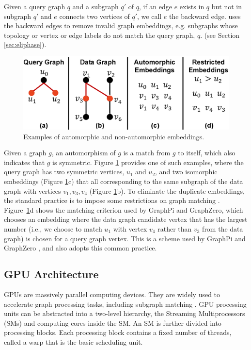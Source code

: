  Given a query graph $q$ and a subgraph $q'$ of $q$, if an edge $e$ exists in $q$ but not in subgraph $q'$ and
$e$ connects two vertices of $q'$, we call $e$ the backward edge. \SystemName uses the backward edges to remove invalid graph embeddings,
e.g. subgraphs whose topology or vertex or edge labels do not match the query graph, $q$.  (see Section \ref{sec:eliphase}).

\begin{figure}[t!]
\centering
\includegraphics[width=\columnwidth]{./figure/automorphism.eps}
\caption{Examples of automorphic and non-automorphic embeddings.}	
\label{fig:automo}
\end{figure}

 Given a graph $g$, an automorphism of $g$ is a match from $g$ to itself, which also indicates that $g$ is symmetric. Figure \ref{fig:automo} provides one of such examples, where the query graph has two symmetric vertices, $u_1$ and $u_2$, and two isomorphic embeddings (Figure \ref{fig:automo}c) that all corresponding to the same subgraph of the data graph with vertices $v_1, v_3, v_4$ (Figure \ref{fig:automo}b). To eliminate the duplicate embeddings, the standard practice is to impose some
restrictions on graph matching \cite{ mawhirter2019graphzero, shi2020graphpi}. Figure~\ref{fig:automo}d shows the matching criterion used
by GraphPi and GraphZero, which chooses an embedding where the data graph candidate vertex that has the largest number (i.e., we choose to
match $u_1$ with vertex $v_4$ rather than $v_3$ from the data graph) is chosen for a query graph vertex. This is a scheme used by GraphPi
\cite{shi2020graphpi} and GraphZero \cite{mawhirter2019graphzero}, and \SystemName also adopts this common practice.

\subsection{GPU Architecture\label{sec:gpu}}
GPUs are massively parallel computing devices. They are widely used to accelerate graph processing tasks, including subgraph matching
\cite{zeng2020gsi,guo2020exploiting,guo2020gpu}. GPU processing units can be abstracted into a two-level hierarchy, the Streaming
Multiprocessors (SMs) and computing cores inside the SM. An SM is further divided into processing blocks. Each processing block contains a
fixed number of threads, called a warp that is the basic scheduling unit.


